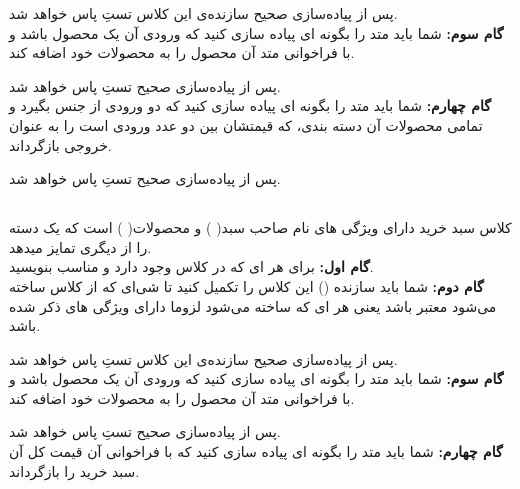     پس از پیاده‌سازی صحیح سازنده‌ی این کلاس تستِ 
    \grayBox{\textcolor{dkgreen}{CategoryConstructorTest}}
    پاس خواهد شد.
    \\
    \textbf{گام سوم: }
    شما باید متد 
    \grayBox{\textcolor{navyBlue}{AddProduct}}
    را بگونه ای پیاده سازی کنید که ورودی آن یک محصول باشد و با فراخوانی متد آن محصول را به محصولات خود اضافه کند.
    
    پس از پیاده‌سازی صحیح تستِ 
    \grayBox{\textcolor{dkgreen}{CategoryAddProductTest}}
    پاس خواهد شد.
\\
    \textbf{گام چهارم: }
    شما باید متد 
    \grayBox{\textcolor{navyBlue}{FilterByPrice}}
    را بگونه ای پیاده سازی کنید که دو ورودی از جنس 
    \grayBox{\textcolor{blue}{int}}
    بگیرد و تمامی محصولات آن دسته بندی، که قیمتشان بین دو عدد ورودی است را به عنوان خروجی بازگرداند.
    
    پس از پیاده‌سازی صحیح تستِ 
    \grayBox{\textcolor{dkgreen}{CategoryFilterByPriceTest}}
    پاس خواهد شد.
    
    \subsection{ }
    کلاس سبد خرید دارای ویژگی های 
    نام صاحب سبد(
    \grayBox{\textcolor{navyBlue}{Owner}}
    )
    و 
    محصولات(
    \grayBox{\textcolor{navyBlue}{Products}}
    )
    است که یک دسته را از دیگری تمایز میدهد.
    \\
    \textbf{گام اول:}
     برای هر 
    \grayBox{\textcolor{navyBlue}{property}}ای 
    که در کلاس وجود دارد 
    \grayBox{\textcolor{navyBlue}{getter}}
    و 
    \grayBox{\textcolor{navyBlue}{setter}}
    مناسب بنویسید.
    \\
    \textbf{گام دوم: }
    شما باید سازنده
    (\grayBox{\textcolor{navyBlue}{constructor}}) 
    این کلاس را تکمیل کنید تا شی‌ای که از کلاس ساخته می‌شود معتبر باشد یعنی هر 
    \grayBox{\textcolor{navyBlue}{Cart}}ای 
    که ساخته می‌شود لزوما دارای ویژگی های ذکر شده باشد.
    
    پس از پیاده‌سازی صحیح سازنده‌ی این کلاس تستِ 
    \grayBox{\textcolor{dkgreen}{CartConstructorTest}}
    پاس خواهد شد.
    \\
    \textbf{گام سوم: }
    شما باید متد 
    \grayBox{\textcolor{navyBlue}{AddProduct}}
    را بگونه ای پیاده سازی کنید که ورودی آن یک محصول باشد و با فراخوانی متد آن محصول را به محصولات خود اضافه کند.
    
    پس از پیاده‌سازی صحیح تستِ 
    \grayBox{\textcolor{dkgreen}{CartAddProductTest}}
    پاس خواهد شد.
    \\
    \textbf{گام چهارم: }
    شما باید متد 
    \grayBox{\textcolor{navyBlue}{CalculatePrice}}
    را بگونه ای پیاده سازی کنید که 
    با فراخوانی آن 
    قیمت کل آن سبد خرید را بازگرداند.
    
